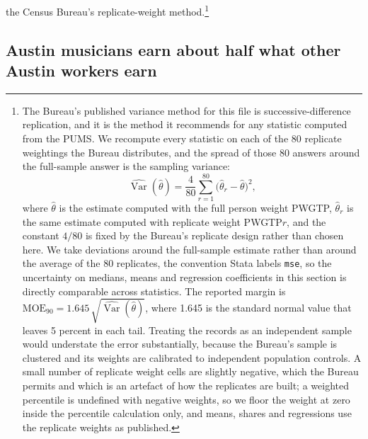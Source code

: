 the Census Bureau's replicate-weight method.\footnote{The Bureau's published
variance method for this file is successive-difference replication, and it
is the method it recommends for any statistic computed from the PUMS. We
recompute every statistic on each of the 80 replicate weightings the Bureau
distributes, and the spread of those 80 answers around the full-sample answer
is the sampling variance:
\[
\widehat{\operatorname{Var}}(\hat\theta)
  = \frac{4}{80}\sum_{r=1}^{80}\bigl(\hat\theta_r - \hat\theta\bigr)^{2},
\]
where \(\hat\theta\) is the estimate computed with the full person weight
PWGTP, \(\hat\theta_r\) is the same estimate computed with replicate weight
PWGTP\(r\), and the constant \(4/80\) is fixed by the Bureau's replicate
design rather than chosen here. We take deviations around the full-sample
estimate rather than around the average of the 80 replicates, the convention
Stata labels \texttt{mse}, so the uncertainty on medians, means and
regression coefficients in this section is directly comparable across
statistics. The reported margin is
\(\mathrm{MOE}_{90} = 1.645\,\sqrt{\widehat{\operatorname{Var}}(\hat\theta)}\),
where 1.645 is the standard normal value that leaves 5 percent in each tail.
Treating the records as an independent sample would understate the error
substantially, because the Bureau's sample is clustered and its weights are
calibrated to independent population controls. A small number of replicate
weight cells are slightly negative, which the Bureau permits and which is an
artefact of how the replicates are built; a weighted percentile is undefined
with negative weights, so we floor the weight at zero inside the percentile
calculation only, and means, shares and regressions use the replicate weights
as published.}

\subsection{Austin musicians earn about half what other Austin workers earn}

